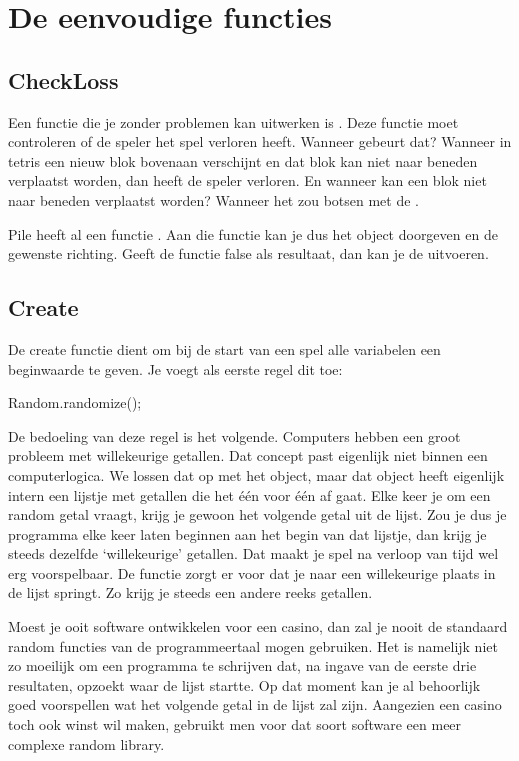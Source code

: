 \section{De eenvoudige functies}
\subsection{CheckLoss}
Een functie die je zonder problemen kan uitwerken is . Deze functie moet controleren of de speler het spel verloren heeft. Wanneer gebeurt dat? Wanneer in tetris een nieuw blok bovenaan verschijnt en dat blok kan niet naar beneden verplaatst worden, dan heeft de speler verloren. En wanneer kan een blok niet naar beneden verplaatst worden? Wanneer het zou botsen met de . 

Pile heeft al een functie . Aan die functie kan je dus het object  doorgeven en de gewenste richting. Geeft de functie false als resultaat, dan kan je de  uitvoeren.

\subsection{Create}
De create functie dient om bij de start van een spel alle variabelen een beginwaarde te geven. Je voegt als eerste regel dit toe:

\begin{code}
Random.randomize();
\end{code}

De bedoeling van deze regel is het volgende. Computers hebben een groot probleem met willekeurige getallen. Dat concept past eigenlijk niet binnen een computerlogica. We lossen dat op met het  object, maar dat object heeft eigenlijk intern een lijstje met getallen die het \'e\'en voor \'e\'en af gaat. Elke keer je om een random getal vraagt, krijg je gewoon het volgende getal uit de lijst. Zou je dus je programma elke keer laten beginnen aan het begin van dat lijstje, dan krijg je steeds dezelfde `willekeurige' getallen. Dat maakt je spel na verloop van tijd wel erg voorspelbaar. De functie  zorgt er voor dat je naar een willekeurige plaats in de lijst springt. Zo krijg je steeds een andere reeks getallen.

\begin{note}
Moest je ooit software ontwikkelen voor een casino, dan zal je nooit de standaard random functies van de programmeertaal mogen gebruiken. Het is namelijk niet zo moeilijk om een programma te schrijven dat, na ingave van de eerste drie resultaten, opzoekt waar de lijst startte. Op dat moment kan je al behoorlijk goed voorspellen wat het volgende getal in de lijst zal zijn. Aangezien een casino toch ook winst wil maken, gebruikt men voor dat soort software een meer complexe random library.
\end{note}

